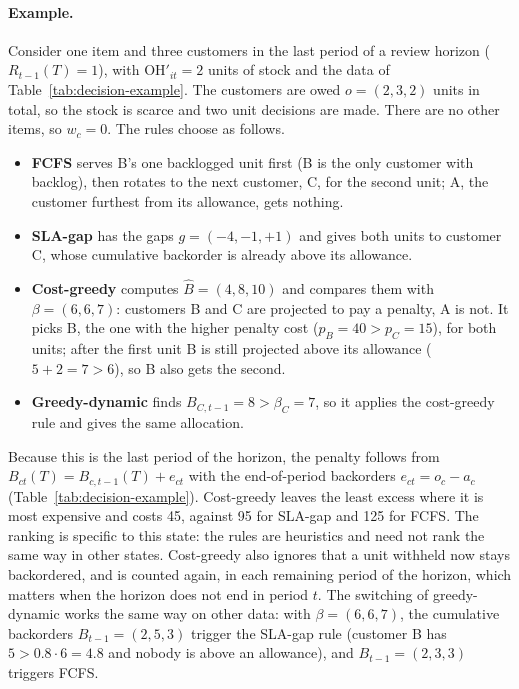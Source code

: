 \documentclass[11pt, a4paper]{article}
\theoremstyle{definition}
\theoremstyle{remark}
\newcommand{\OH}{\text{OH}}
\begin{document}
\paragraph{Example.} Consider one item and three customers in the last period of a review horizon ($R_{t-1}(T) = 1$), with $\OH'_{it} = 2$ units of stock and the data of Table~\ref{tab:decision-example}. The customers are owed $o = (2, 3, 2)$ units in total, so the stock is scarce and two unit decisions are made. There are no other items, so $w_c = 0$. The rules choose as follows.
\begin{itemize}
    \item \textbf{FCFS} serves B's one backlogged unit first (B is the only customer with backlog), then rotates to the next customer, C, for the second unit; A, the customer furthest from its allowance, gets nothing.
    \item \textbf{SLA-gap} has the gaps $g = (-4, -1, +1)$ and gives both units to customer C, whose cumulative backorder is already above its allowance.
    \item \textbf{Cost-greedy} computes $\widehat{B} = (4, 8, 10)$ and compares them with $\beta = (6, 6, 7)$: customers B and C are projected to pay a penalty, A is not. It picks B, the one with the higher penalty cost ($p_B = 40 > p_C = 15$), for both units; after the first unit B is still projected above its allowance ($5 + 2 = 7 > 6$), so B also gets the second.
    \item \textbf{Greedy-dynamic} finds $B_{C,t-1} = 8 > \beta_C = 7$, so it applies the cost-greedy rule and gives the same allocation.
\end{itemize}
Because this is the last period of the horizon, the penalty follows from $B_{ct}(T) = B_{c,t-1}(T) + e_{ct}$ with the end-of-period backorders $e_{ct} = o_c - a_{c}$ (Table~\ref{tab:decision-example}). Cost-greedy leaves the least excess where it is most expensive and costs 45, against 95 for SLA-gap and 125 for FCFS. The ranking is specific to this state: the rules are heuristics and need not rank the same way in other states. Cost-greedy also ignores that a unit withheld now stays backordered, and is counted again, in each remaining period of the horizon, which matters when the horizon does not end in period $t$. The switching of greedy-dynamic works the same way on other data: with $\beta = (6, 6, 7)$, the cumulative backorders $B_{t-1} = (2, 5, 3)$ trigger the SLA-gap rule (customer B has $5 > 0.8 \cdot 6 = 4.8$ and nobody is above an allowance), and $B_{t-1} = (2, 3, 3)$ triggers FCFS.
\end{document}
